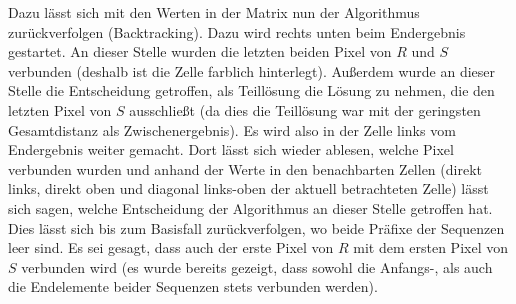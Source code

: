 \documentclass{whswinvcbook}
\begin{document}
Dazu lässt sich mit den Werten in der Matrix nun der Algorithmus zurückverfolgen (Backtracking). Dazu wird rechts unten beim Endergebnis gestartet. An dieser Stelle wurden die letzten beiden Pixel von $R$ und $S$ verbunden (deshalb ist die Zelle farblich hinterlegt). Außerdem wurde an dieser Stelle die Entscheidung getroffen, als Teillösung die Lösung zu nehmen, die den letzten Pixel von $S$ ausschließt (da dies die Teillösung war mit der geringsten Gesamtdistanz als Zwischenergebnis). Es wird also in der Zelle links vom Endergebnis weiter gemacht. Dort lässt sich wieder ablesen, welche Pixel verbunden wurden und anhand der Werte in den benachbarten Zellen (direkt links, direkt oben und diagonal links-oben der aktuell betrachteten Zelle) lässt sich sagen, welche Entscheidung der Algorithmus an dieser Stelle getroffen hat. Dies lässt sich bis zum Basisfall zurückverfolgen, wo beide Präfixe der Sequenzen leer sind. Es sei gesagt, dass auch der erste Pixel von $R$ mit dem ersten Pixel von $S$ verbunden wird (es wurde bereits gezeigt, dass sowohl die Anfangs-, als auch die Endelemente beider Sequenzen stets verbunden werden).
\end{document}

